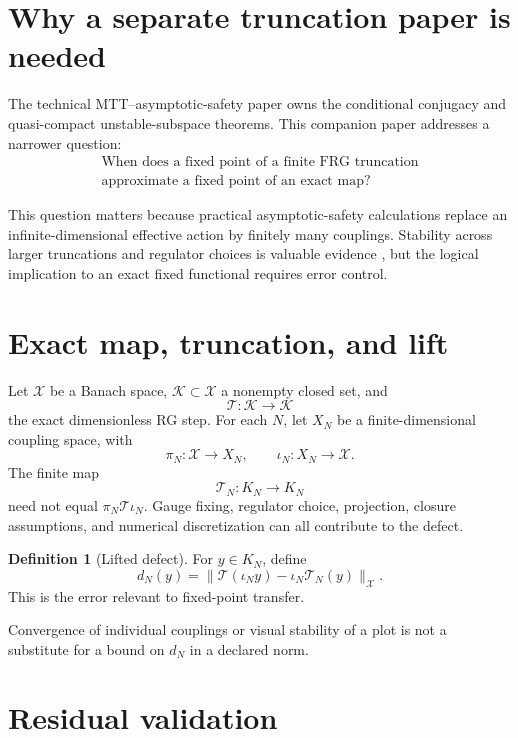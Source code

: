 \documentclass[11pt]{article}
\theoremstyle{definition}
\newtheorem{definition}[theorem]{Definition}
\theoremstyle{remark}
\newcommand{\X}{\mathcal X}
\newcommand{\Kset}{\mathcal K}
\newcommand{\Tmap}{\mathcal T}
\newcommand{\TN}{\mathcal T_N}
\newcommand{\iotaN}{\iota_N}
\newcommand{\piN}{\pi_N}
\begin{document}
\tableofcontents

\section{Why a separate truncation paper is needed}

The technical MTT--asymptotic-safety paper owns the conditional conjugacy
and quasi-compact unstable-subspace theorems. This companion paper addresses
a narrower question:
\[
\begin{gathered}
\text{When does a fixed point of a finite FRG truncation}\\
\text{approximate a fixed point of an exact map?}
\end{gathered}
\]

This question matters because practical asymptotic-safety calculations
replace an infinite-dimensional effective action by finitely many couplings.
Stability across larger truncations and regulator choices is valuable
evidence \cite{ReuterSaueressig}, but the logical implication to an exact
fixed functional requires error control.

\section{Exact map, truncation, and lift}

Let \(\X\) be a Banach space, \(\Kset\subset\X\) a nonempty closed set, and
\[
 \Tmap:\Kset\to\Kset
\]
the exact dimensionless RG step. For each \(N\), let \(X_N\) be a
finite-dimensional coupling space, with
\[
 \piN:\X\to X_N,\qquad
 \iotaN:X_N\to\X.
\]
The finite map
\[
 \TN:K_N\to K_N
\]
need not equal \(\piN\Tmap\iotaN\). Gauge fixing, regulator choice,
projection, closure assumptions, and numerical discretization can all
contribute to the defect.

\begin{definition}[Lifted defect]
For \(y\in K_N\), define
\[
 d_N(y)=\|\Tmap(\iotaN y)-\iotaN\TN(y)\|_{\X}.
\]
This is the error relevant to fixed-point transfer.
\end{definition}

Convergence of individual couplings or visual stability of a plot is not a
substitute for a bound on \(d_N\) in a declared norm.

\section{Residual validation}
\end{document}
